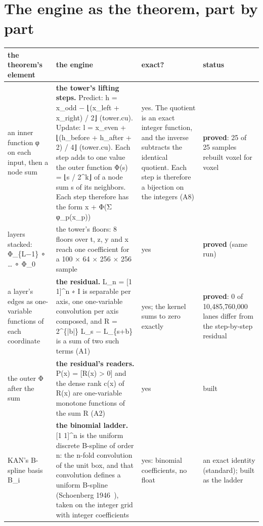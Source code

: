 \section{\texorpdfstring{The engine as the theorem, part by part}{The engine as the theorem, part by part}}

{\footnotesize
\setlength{\tabcolsep}{6pt}
\begin{longtable}{>{\RaggedRight\arraybackslash}p{}>{\RaggedRight\arraybackslash}p{}>{\RaggedRight\arraybackslash}p{}>{\RaggedRight\arraybackslash}p{}}
\toprule
the theorem's element & the engine & exact? & status \\
\midrule
\endhead
an inner function φ on each input, then a node sum & \textbf{the tower's lifting steps.} Predict: h = x\_\allowbreak{}odd − ⌊(x\_\allowbreak{}left + x\_\allowbreak{}right) / 2⌋ (tower.cu). Update: l = x\_\allowbreak{}even + ⌊(h\_\allowbreak{}before + h\_\allowbreak{}after + 2) / 4⌋ (tower.cu). Each step adds to one value the outer function Φ(s) = ⌊s / 2\textasciicircum{}k⌋ of a node sum s of its neighbors. Each step therefore has the form x + Φ(Σ φ\_\allowbreak{}p(x\_\allowbreak{}p)) & yes. The quotient is an exact integer function, and the inverse subtracts the identical quotient. Each step is therefore a bijection on the integers (A8) & \textbf{proved}: 25 of 25 samples rebuilt voxel for voxel \\
layers stacked: Φ\_\allowbreak{}\{L−1\} ∘ … ∘ Φ\_\allowbreak{}0 & the tower's floors: 8 floors over t, z, y and x reach one coefficient for a 100 × 64 × 256 × 256 sample & yes & \textbf{proved} (same run) \\
a layer's edges as one-variable functions of each coordinate & \textbf{the residual.} L\_\allowbreak{}n = [1 1]\textasciicircum{}n ∗ I is separable per axis, one one-variable convolution per axis composed, and R = 2\textasciicircum{}\{|b|\} L\_\allowbreak{}s − L\_\allowbreak{}\{s+b\} is a sum of two such terms (A1) & yes; the kernel sums to zero exactly & \textbf{proved}: 0 of 10,485,760,000 lanes differ from the step-by-step residual \\
the outer Φ after the sum & \textbf{the residual's readers.} P(x) = [R(x) > 0] and the dense rank c(x) of R(x) are one-variable monotone functions of the sum R (A2) & yes & built \\
KAN's B-spline basis B\_\allowbreak{}i & \textbf{the binomial ladder.} [1 1]\textasciicircum{}n is the uniform discrete B-spline of order n: the n-fold convolution of the unit box, and that convolution defines a uniform B-spline (Schoenberg 1946~\cite{src:Schoenberg-1946}), taken on the integer grid with integer coefficients & yes: binomial coefficients, no float & an exact identity (standard); built as the ladder \\

\end{longtable}}
